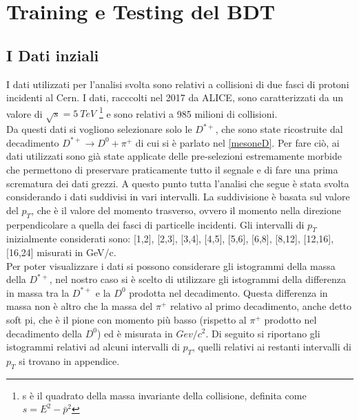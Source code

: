 \chapter{Training e Testing del BDT}

\section{I Dati inziali}

I dati utilizzati per l'analisi svolta sono relativi a collisioni di due fasci di protoni incidenti al Cern. I dati, racccolti nel 2017 da ALICE, sono caratterizzati da un valore di $\sqrt{s} = 5 \ TeV$ \footnote{s è il quadrato della massa invariante della collisione, definita come $s = E^2 - \bar p ^2$} e sono relativi a 985 milioni di collisioni.
\\Da questi dati si vogliono selezionare solo le $D^{*+}$, che sono state ricostruite dal decadimento $D^{*+} \rightarrow D^0 + \pi^+ $ di cui si è parlato nel \ref{mesoneD}. Per fare ciò, ai dati utilizzati sono già state applicate delle pre-selezioni estremamente morbide che permettono di preservare praticamente tutto il segnale e di fare una prima scrematura dei dati grezzi.
A questo punto tutta l'analisi che segue è stata svolta considerando i dati suddivisi in vari intervalli. La suddivisione è basata sul valore del $p_T$, che è il valore del momento trasverso, ovvero il momento nella direzione perpendicolare a quella dei fasci di particelle incidenti. Gli intervalli di $p_T$ inizialmente considerati sono: [1,2], [2,3], [3,4], [4,5], [5,6], [6,8], [8,12], [12,16], [16,24] misurati in GeV/c. 
\\Per poter visualizzare i dati si possono considerare gli istogrammi della massa della $D^{*+}$, nel nostro caso si è scelto di utilizzare gli istogrammi della differenza in massa tra la $D^{*+}$ e la $D^0$ prodotta nel decadimento. Questa differenza in massa non è altro che la massa del $\pi^+$ relativo al primo decadimento, anche detto soft pi, che è il pione con momento più basso (rispetto al $\pi^+$ prodotto nel decadimento della $D^0$) ed è misurata in $Gev/c^2$. %
Di seguito si riportano gli istogrammi relativi ad alcuni intervalli di $p_T$, quelli relativi ai restanti intervalli di $p_T$ si trovano in appendice. 

